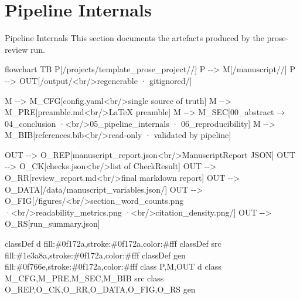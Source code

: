 \documentclass[
  ignorenonframetext,
]{beamer}
\author{\texorpdfstring{}{}}
\date{}
\newenvironment{Shaded}{}{}
\newcommand{\NormalTok}[1]{#1}
\begin{document}
\section{Pipeline Internals}\label{sec:pipeline_internals}

\begin{frame}{Pipeline Internals}
This section documents the artefacts produced by the prose-review run.

\begin{Shaded}
\begin{Highlighting}[]
\NormalTok{flowchart TB}
\NormalTok{    P[/projects/template\_prose\_project//]}
\NormalTok{    P {-}{-}\textgreater{} M[/manuscript//]}
\NormalTok{    P {-}{-}\textgreater{} OUT[/output/\textless{}br/\textgreater{}regenerable · gitignored/]}

\NormalTok{    M {-}{-}\textgreater{} M\_CFG[config.yaml\textless{}br/\textgreater{}single source of truth]}
\NormalTok{    M {-}{-}\textgreater{} M\_PRE[preamble.md\textless{}br/\textgreater{}LaTeX preamble]}
\NormalTok{    M {-}{-}\textgreater{} M\_SEC[00\_abstract → 04\_conclusion ·\textless{}br/\textgreater{}05\_pipeline\_internals · 06\_reproducibility]}
\NormalTok{    M {-}{-}\textgreater{} M\_BIB[references.bib\textless{}br/\textgreater{}read{-}only · validated by pipeline]}

\NormalTok{    OUT {-}{-}\textgreater{} O\_REP[manuscript\_report.json\textless{}br/\textgreater{}ManuscriptReport JSON]}
\NormalTok{    OUT {-}{-}\textgreater{} O\_CK[checks.json\textless{}br/\textgreater{}list of CheckResult]}
\NormalTok{    OUT {-}{-}\textgreater{} O\_RR[review\_report.md\textless{}br/\textgreater{}final markdown report]}
\NormalTok{    OUT {-}{-}\textgreater{} O\_DATA[/data/manuscript\_variables.json/]}
\NormalTok{    OUT {-}{-}\textgreater{} O\_FIG[/figures/\textless{}br/\textgreater{}section\_word\_counts.png ·\textless{}br/\textgreater{}readability\_metrics.png ·\textless{}br/\textgreater{}citation\_density.png/]}
\NormalTok{    OUT {-}{-}\textgreater{} O\_RS[run\_summary.json]}

\NormalTok{    classDef d fill:\#0f172a,stroke:\#0f172a,color:\#fff}
\NormalTok{    classDef src fill:\#1e3a8a,stroke:\#0f172a,color:\#fff}
\NormalTok{    classDef gen fill:\#0f766e,stroke:\#0f172a,color:\#fff}
\NormalTok{    class P,M,OUT d}
\NormalTok{    class M\_CFG,M\_PRE,M\_SEC,M\_BIB src}
\NormalTok{    class O\_REP,O\_CK,O\_RR,O\_DATA,O\_FIG,O\_RS gen}
\end{Highlighting}
\end{Shaded}
\end{frame}
\end{document}
